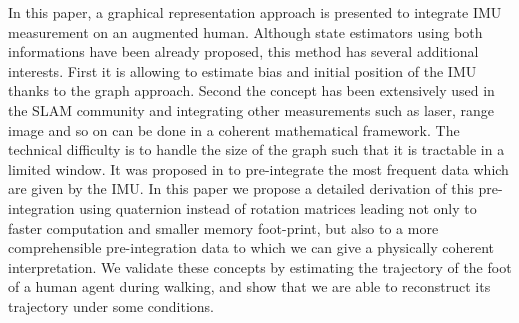 %
%
In this paper, a graphical representation approach is presented to integrate 
IMU measurement on an augmented human. Although state estimators using both
informations \cite{Johnson:jof:2016,Fallon:ichr:2014} have been already proposed, this method has several additional interests.
First it is allowing to estimate bias and initial position of the IMU thanks to the graph
approach. Second the concept has been extensively used in the SLAM community and integrating 
other measurements such as laser, range image and so on can be done in a coherent mathematical framework.
The technical difficulty is to handle the size of the graph such that it is tractable in a limited window.
It was proposed in \cite{forster2015imu} to pre-integrate the most frequent data which are given by the IMU.
In this paper we propose a detailed derivation of this pre-integration using quaternion instead
of rotation matrices leading not only to faster computation and smaller memory foot-print,
but also to a more comprehensible pre-integration data to which we can give a physically coherent interpretation.
We validate these concepts by estimating the trajectory of the foot of a human agent during walking,
and show that we are able to reconstruct its trajectory under some conditions.
